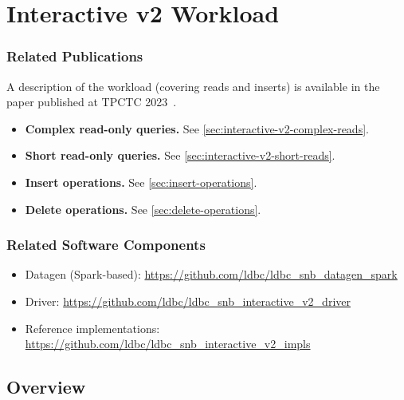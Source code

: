 \chapter{Interactive v2 Workload}
\label{sec:interactive-v2}

\subsection*{Related Publications}

A description of the workload (covering reads and inserts) is available in the paper published at TPCTC 2023~\cite{DBLP:journals/corr/abs-2307-04820}.

\begin{itemize}
    \item \textbf{Complex read-only queries.} See \autoref{sec:interactive-v2-complex-reads}.
    \item \textbf{Short read-only queries.} See \autoref{sec:interactive-v2-short-reads}.
    \item \textbf{Insert operations.} See \autoref{sec:insert-operations}.
    \item \textbf{Delete operations.} See \autoref{sec:delete-operations}.
\end{itemize}

\subsection*{Related Software Components}

\begin{itemize}
    \item Datagen (Spark-based): \url{https://github.com/ldbc/ldbc_snb_datagen_spark}
    \item Driver: \url{https://github.com/ldbc/ldbc_snb_interactive_v2_driver}
    \item Reference implementations: \url{https://github.com/ldbc/ldbc_snb_interactive_v2_impls}
\end{itemize}


\section{Overview}

